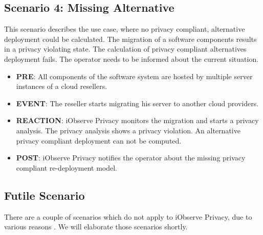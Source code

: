 \subsection{Scenario 4: Missing Alternative}
\label{eval:scenario:4}
This scenario describes the use case, where no privacy compliant, alternative deployment could be calculated. The migration of a software components results in a privacy violating state. The calculation of privacy compliant alternatives deployment fails. The operator needs to be informed about the current situation.
\begin{itemize}
	\setlength\itemsep{0em}
	\item \textbf{PRE}: All components of the software system are hosted by multiple server instances of a cloud resellers. 
	\item \textbf{EVENT}: The reseller starts migrating his server to another cloud providers.
	\item \textbf{REACTION}: iObserve Privacy monitors the migration and starts a privacy analysis. The privacy analysis shows a privacy violation. An alternative privacy compliant deployment can not be computed.
	\item \textbf{POST}: iObserve Privacy notifies the operator about the missing privacy compliant re-deployment model.
\end{itemize}


\subsection{Futile Scenario}
There are a couple of scenarios which do not apply to iObserve Privacy, due to various reasons \cite{Heinrich.2016b}. We will elaborate those scenarios shortly.

